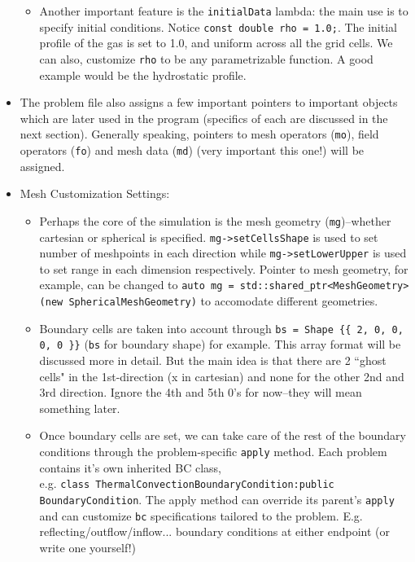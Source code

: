 \documentclass{article}
\begin{document}
\begin{itemize}
\begin{itemize}
		\item Another important feature is the \texttt{initialData} lambda: the main use is to specify initial conditions. Notice \texttt{const double rho = 1.0;}. The initial profile of the gas is set to 1.0, and uniform across all the grid cells. We can also, customize \texttt{rho} to be any parametrizable function. A good example would be the hydrostatic profile. 
		
	\end{itemize}		
	
	
	\item The problem file also assigns a few important pointers to important objects which are later used in the program (specifics of each are discussed in the next section). Generally speaking, pointers to mesh operators (\texttt{mo}), field operators (\texttt{fo}) and mesh data (\texttt{md}) (very important this one!) will be assigned.
	
	\item Mesh Customization Settings:
	\begin{itemize}	
		\item Perhaps the core of the simulation is the mesh geometry (\texttt{mg})--whether cartesian or spherical is specified. \texttt{mg->setCellsShape} is used to set number of meshpoints in each direction while \texttt{mg->setLowerUpper} is used to set range in each dimension respectively. Pointer to mesh geometry, for example, can be changed to \texttt{auto mg = std::shared\_ptr<MeshGeometry> (new SphericalMeshGeometry)} to accomodate different geometries.
		
		\item Boundary cells are taken into account through \texttt{bs = Shape \{\{ 2, 0, 0, 0, 0 \}\}} (\texttt{bs} for boundary shape) for example. This array format will be discussed more in detail. But the main idea is that there are 2 ``ghost cells" in the 1st-direction (x in cartesian) and none for the other 2nd and 3rd direction. Ignore the 4th and 5th 0's for now--they will mean something later. 
		
		\item Once boundary cells are set, we can take care of the rest of the boundary conditions through the problem-specific \texttt{apply} method. Each problem contains it's own inherited BC class, \\
	e.g. \texttt{class ThermalConvectionBoundaryCondition:public BoundaryCondition}. The apply method can override its parent's \texttt{apply} and can customize \texttt{bc} specifications tailored to the problem. E.g. reflecting/outflow/inflow... boundary conditions at either endpoint (or write one yourself!)   
		

\end{itemize}
\end{itemize}
\end{document}

